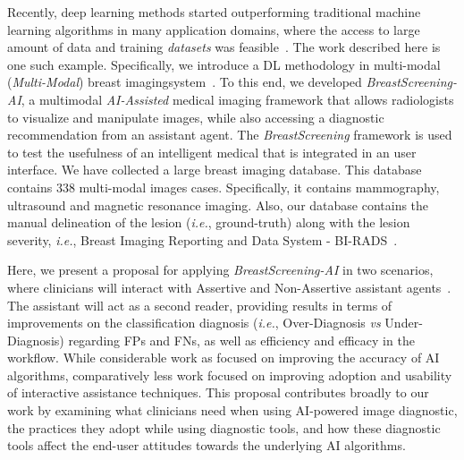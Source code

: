 Recently, deep learning methods started outperforming traditional machine learning algorithms in many application domains, where the access to large amount of data and training {\it datasets} was feasible~\cite{mckinney2020international}.
The work described here is one such example.
Specifically, we introduce a  DL methodology in multi-modal ({\it Multi-Modal}) breast imaging\footnotemark[1] system~\cite{calisto2017mimbcdui, https://doi.org/10.13140/rg.2.2.29816.70409}.
To this end, we developed {\it BreastScreening-AI}, a multimodal {\it AI-Assisted} medical imaging framework that allows radiologists to visualize and manipulate images, while also accessing a diagnostic recommendation from an assistant agent.
The {\it BreastScreening} framework is used to test the usefulness of an intelligent medical that is integrated in an user interface.
We have collected a large breast imaging database. This database contains 338 multi-modal images cases. Specifically, it contains mammography, ultrasound and magnetic resonance imaging.
Also, our database contains the manual delineation of the lesion ({\it i.e.}, ground-truth) along with the lesion severity, {\it i.e.}, Breast Imaging Reporting and Data System - BI-RADS~\cite{ghosh2019artificial}.


Here, we present a proposal for applying {\it BreastScreening-AI} in two scenarios, where clinicians will interact with Assertive and Non-Assertive assistant agents~\cite{pacheco2019alignment, 10.1145/3311350.3347162}.
The assistant will act as a second reader, providing results in terms of improvements on the classification diagnosis ({\it i.e.}, Over-Diagnosis {\it vs} Under-Diagnosis) regarding FPs and FNs, as well as efficiency and efficacy in the workflow.
While considerable work as focused on improving the accuracy of AI algorithms, comparatively less work focused on improving adoption and usability of interactive assistance techniques.
This proposal contributes broadly to our work by examining what clinicians need when using AI-powered image diagnostic, the practices they adopt while using diagnostic tools, and how these diagnostic tools affect the end-user attitudes towards the underlying AI algorithms.